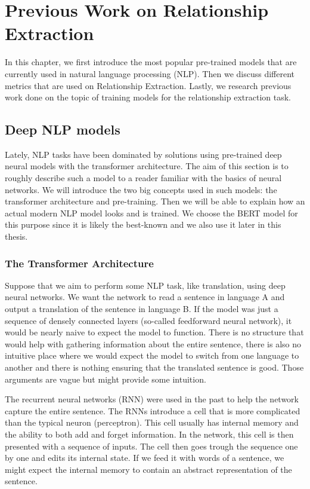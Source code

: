 \chapter{Previous Work on Relationship Extraction}
In this chapter, we first introduce the most popular pre-trained models that are currently used in natural language processing (NLP). Then we discuss different metrics that are used on Relationship Extraction. Lastly, we research previous work done on the topic of training models for the relationship extraction task.

\section{Deep NLP models}
Lately, NLP tasks have been dominated by solutions using pre-trained deep neural models with the transformer architecture. The aim of this section is to roughly describe such a model to a reader familiar with the basics of neural networks. We will introduce the two big concepts used in such models: the transformer architecture and pre-training. Then we will be able to explain how an actual modern NLP model looks and is trained. We choose the BERT model for this purpose since it is likely the best-known and we also use it later in this thesis. 



\subsection{The Transformer Architecture}
Suppose that we aim to perform some NLP task, like translation, using deep neural networks. We want the network to read a sentence in language A and output a translation of the sentence in language B. If the model was just a sequence of densely connected layers (so-called feedforward neural network), it would be nearly naive to expect the model to function. There is no structure that would help with gathering information about the entire sentence, there is also no intuitive place where we would expect the model to switch from one language to another and there is nothing ensuring that the translated sentence is good. Those arguments are vague but might provide some intuition.

The recurrent neural networks (RNN) were used in the past to help the network capture the entire sentence. The RNNs introduce a cell that is more complicated than the typical neuron (perceptron). This cell usually has internal memory and the ability to both add and forget information. In the network, this cell is then presented with a sequence of inputs. The cell then goes trough the sequence one by one and edits its internal state. If we feed it with words of a sentence, we might expect the internal memory to contain an abstract representation of the sentence. 


